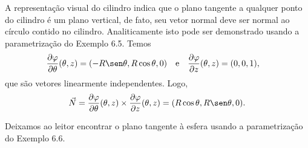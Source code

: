 \begin{example}{}{}
A representação visual do cilindro indica que o plano tangente a qualquer ponto do cilindro é um plano vertical, de fato, seu vetor normal deve ser normal ao círculo contido no cilindro. Analiticamente isto pode ser demonstrado usando a parametrização do Exemplo 6.5. Temos
\begin{align*}
\dfrac{\partial \varphi}{\partial \theta}(\theta,z)&=(-R\sen\theta,R\cos\theta,0)
\quad\mbox{e}\quad
\dfrac{\partial \varphi}{\partial z}(\theta,z)=(0,0,1),
\end{align*}
que são vetores linearmente independentes. 
Logo, 
$$\vec{N}=\dfrac{\partial \varphi}{\partial \theta}(\theta,z)\times \dfrac{\partial \varphi}{\partial z}(\theta,z)=(R\cos\theta,R\sen\theta,0).$$ 
\end{example}

Deixamos ao leitor encontrar o plano tangente à esfera usando a parametrização do Exemplo 6.6. 

